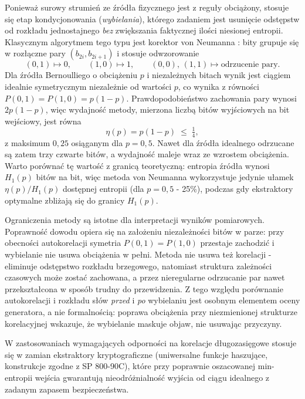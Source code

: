 Ponieważ surowy strumień ze źródła fizycznego jest z reguły obciążony,
stosuje się etap kondycjonowania (\emph{wybielania}), którego zadaniem jest
usunięcie odstępstw od rozkładu jednostajnego \emph{bez} zwiększania
faktycznej ilości niesionej entropii. Klasycznym algorytmem tego typu jest
korektor von Neumanna \cite{vonneumann1951}: bity grupuje się w rozłączne
pary $(b_{2i}, b_{2i+1})$ i stosuje odwzorowanie
%
\begin{equation}
  (0,1) \mapsto 0, \qquad (1,0) \mapsto 1, \qquad
  (0,0),\,(1,1) \mapsto \text{odrzucenie pary}.
  \label{eq:von-neumann}
\end{equation}
%
Dla źródła Bernoulliego o obciążeniu $p$ i niezależnych bitach wynik jest
ciągiem idealnie symetrycznym niezależnie od wartości $p$, co wynika z
równości $P(0,1) = P(1,0) = p(1-p)$. Prawdopodobieństwo zachowania pary
wynosi $2p(1-p)$, więc wydajność metody, mierzona liczbą bitów wyjściowych
na bit wejściowy, jest równa
%
\begin{equation}
  \eta(p) = p(1-p) \;\le\; \tfrac{1}{4},
  \label{eq:wydajnosc-vn}
\end{equation}
%
z maksimum $0{,}25$ osiąganym dla $p = 0{,}5$. Nawet dla źródła idealnego
odrzucane są zatem trzy czwarte bitów, a wydajność maleje wraz ze wzrostem
obciążenia. Warto porównać tę wartość z granicą teoretyczną: entropia
źródła wynosi $H_1(p)$ bitów na bit, więc metoda von Neumanna wykorzystuje
jedynie ułamek $\eta(p)/H_1(p)$ dostępnej entropii (dla $p = 0{,}5$ -
25\%), podczas gdy ekstraktory optymalne zbliżają się do granicy $H_1(p)$.

Ograniczenia metody są istotne dla interpretacji wyników pomiarowych.
Poprawność dowodu opiera się na założeniu niezależności bitów w parze:
przy obecności autokorelacji symetria $P(0,1) = P(1,0)$ przestaje zachodzić
i wybielanie nie usuwa obciążenia w pełni. Metoda nie usuwa też korelacji
- eliminuje odstępstwo rozkładu brzegowego, natomiast struktura zależności
czasowych może zostać zachowana, a przez nieregularne odrzucanie par nawet
przekształcona w sposób trudny do przewidzenia. Z tego względu porównanie
autokorelacji i rozkładu słów \emph{przed} i \emph{po} wybielaniu jest
osobnym elementem oceny generatora, a nie formalnością: poprawa obciążenia
przy niezmienionej strukturze korelacyjnej wskazuje, że wybielanie
maskuje objaw, nie usuwając przyczyny.

W zastosowaniach wymagających odporności na korelacje długozasięgowe
stosuje się w zamian ekstraktory kryptograficzne (uniwersalne funkcje
haszujące, konstrukcje zgodne z SP 800-90C), które przy poprawnie
oszacowanej min-entropii wejścia gwarantują nieodróżnialność wyjścia od
ciągu idealnego z zadanym zapasem bezpieczeństwa.